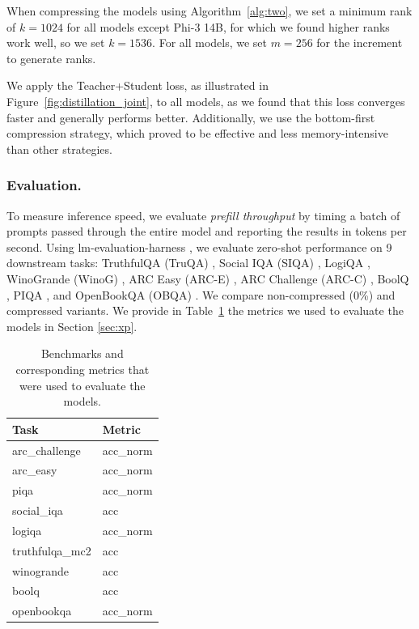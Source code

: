 When compressing the models using Algorithm~\ref{alg:two}, we set a minimum rank of $k=1024$ for all models except Phi-3 14B, for which we found higher ranks work well, so we set $k=1536$. For all models, we set $m=256$ for the increment to generate ranks.

We apply the Teacher+Student loss, as illustrated in Figure~\ref{fig:distillation_joint}, to all models, as we found that this loss converges faster and generally performs better. Additionally, we use the bottom-first compression strategy, which proved to be effective and less memory-intensive than other strategies.

\subsubsection{Evaluation.}
To measure inference speed, we evaluate \textit{prefill throughput} by timing a batch of prompts passed through the entire model and reporting the results in tokens per second. Using lm-evaluation-harness \citep{eval-harness}, we evaluate zero-shot performance on 9 downstream tasks: TruthfulQA (TruQA) \citep{lin-etal-2022-truthfulqa}, Social IQA (SIQA) \citep{sap2019social}, LogiQA \citep{liu2020logiqa}, WinoGrande (WinoG) \citep{sakaguchi2019winogrande}, ARC Easy (ARC-E) \citep{arc}, ARC Challenge (ARC-C) \citep{arc}, BoolQ \citep{boolq}, PIQA \citep{piqa}, and OpenBookQA (OBQA) \citep{obqa}. We compare non-compressed (0\%) and compressed variants.
We provide in Table~\ref{tab:task_metric_map} the metrics we used to evaluate the models in Section \ref{sec:xp}.
\begin{table}[!ht]
\centering
    \begin{tabular}{ll}
    \toprule
    \textbf{Task} & \textbf{Metric} \\ 
    \midrule
    arc\_challenge   & acc\_norm \\ 
    arc\_easy        & acc\_norm \\ 
    piqa             & acc\_norm \\ 
    social\_iqa      & acc \\ 
    logiqa           & acc\_norm \\ 
    truthfulqa\_mc2  & acc \\ 
    winogrande       & acc \\ 
    boolq            & acc \\ 
    openbookqa       & acc\_norm \\ 
    \bottomrule
    \end{tabular}
\caption{Benchmarks and corresponding metrics that were used to evaluate the models.}
\label{tab:task_metric_map}
\end{table}


